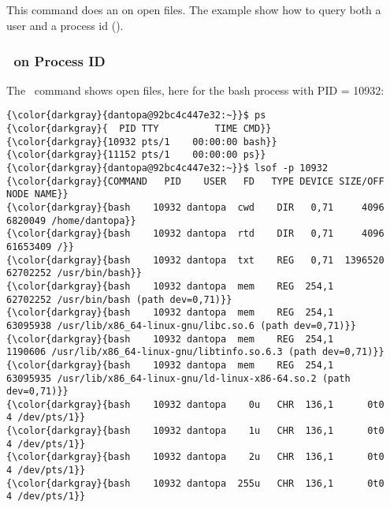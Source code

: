 % 

\subsection{\lsof}
\label{sec:lsof}
This command does an  on open files. The example show how to query both a user and a process id ().
		\subsubsection{\lsof \ on Process ID}
The  \ command shows open files, here for the bash process with PID = 10932:
{\footnotesize{
\begin{Verbatim}[commandchars=\\\{\}]
{\color{darkgray}{dantopa@92bc4c447e32:~}}$ ps
{\color{darkgray}{  PID TTY          TIME CMD}}
{\color{darkgray}{10932 pts/1    00:00:00 bash}}
{\color{darkgray}{11152 pts/1    00:00:00 ps}}
{\color{darkgray}{dantopa@92bc4c447e32:~}}$ lsof -p 10932
{\color{darkgray}{COMMAND   PID    USER   FD   TYPE DEVICE SIZE/OFF     NODE NAME}}
{\color{darkgray}{bash    10932 dantopa  cwd    DIR   0,71     4096  6820049 /home/dantopa}}
{\color{darkgray}{bash    10932 dantopa  rtd    DIR   0,71     4096 61653409 /}}
{\color{darkgray}{bash    10932 dantopa  txt    REG   0,71  1396520 62702252 /usr/bin/bash}}
{\color{darkgray}{bash    10932 dantopa  mem    REG  254,1          62702252 /usr/bin/bash (path dev=0,71)}}
{\color{darkgray}{bash    10932 dantopa  mem    REG  254,1          63095938 /usr/lib/x86_64-linux-gnu/libc.so.6 (path dev=0,71)}}
{\color{darkgray}{bash    10932 dantopa  mem    REG  254,1           1190606 /usr/lib/x86_64-linux-gnu/libtinfo.so.6.3 (path dev=0,71)}}
{\color{darkgray}{bash    10932 dantopa  mem    REG  254,1          63095935 /usr/lib/x86_64-linux-gnu/ld-linux-x86-64.so.2 (path dev=0,71)}}
{\color{darkgray}{bash    10932 dantopa    0u   CHR  136,1      0t0        4 /dev/pts/1}}
{\color{darkgray}{bash    10932 dantopa    1u   CHR  136,1      0t0        4 /dev/pts/1}}
{\color{darkgray}{bash    10932 dantopa    2u   CHR  136,1      0t0        4 /dev/pts/1}}
{\color{darkgray}{bash    10932 dantopa  255u   CHR  136,1      0t0        4 /dev/pts/1}}
\end{Verbatim}
}
}
